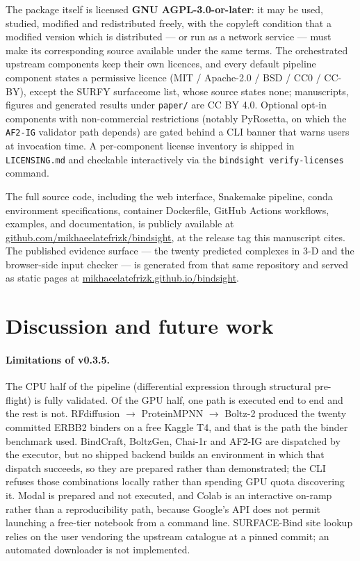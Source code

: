 \documentclass[11pt,letterpaper]{article}
\begin{document}
The package itself is licensed \textbf{GNU AGPL-3.0-or-later}: it may be used,
studied, modified and redistributed freely, with the copyleft condition that a
modified version which is distributed --- or run as a network service --- must
make its corresponding source available under the same terms. The orchestrated
upstream components keep their own licences, and every default pipeline
component states a permissive licence (MIT / Apache-2.0 / BSD / CC0 / CC-BY),
except the SURFY surfaceome list, whose source states none; manuscripts, figures
and generated results under \texttt{paper/} are CC BY 4.0.
Optional opt-in components with non-commercial restrictions
(notably PyRosetta, on which the \texttt{AF2-IG} validator path depends) are
gated behind a CLI banner that warns users at invocation time.
A per-component license inventory is shipped in \texttt{LICENSING.md} and
checkable interactively via the \texttt{bindsight verify-licenses} command.

The full source code, including the web interface, Snakemake
pipeline, conda environment specifications, container Dockerfile, GitHub
Actions workflows, examples, and documentation, is publicly available at
\href{https://github.com/mikhaeelatefrizk/bindsight}{github.com/mikhaeelatefrizk/bindsight},
at the release tag this manuscript cites.
The published evidence surface --- the twenty predicted complexes in 3-D and
the browser-side input checker --- is generated from that same repository and
served as static pages at \href{https://mikhaeelatefrizk.github.io/bindsight/}{mikhaeelatefrizk.github.io/bindsight}.

\section{Discussion and future work}

\paragraph{Limitations of v0.3.5.} The CPU half of the pipeline
(differential expression through structural pre-flight) is fully validated. Of
the GPU half, one path is executed end to end and the rest is not.
RFdiffusion $\to$ ProteinMPNN $\to$ Boltz-2 produced the twenty committed ERBB2
binders on a free Kaggle T4, and that is the path the binder benchmark used.
BindCraft, BoltzGen, Chai-1r and AF2-IG are dispatched by the executor, but no
shipped backend builds an environment in which that dispatch succeeds, so they
are prepared rather than demonstrated; the CLI refuses those combinations
locally rather than spending GPU quota discovering it. Modal is prepared and not
executed, and Colab is an interactive on-ramp rather than a reproducibility
path, because Google's API does not permit launching a free-tier notebook from a
command line. SURFACE-Bind site lookup relies on the user vendoring the upstream
catalogue at a pinned commit; an automated downloader is not implemented.
\end{document}
